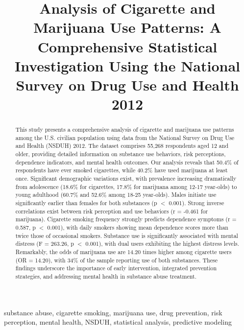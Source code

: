 \documentclass[conference]{IEEEtran}
\begin{document}
\title{Analysis of Cigarette and Marijuana Use Patterns: A Comprehensive Statistical Investigation Using the National Survey on Drug Use and Health 2012}

\author{
}

\maketitle

\begin{abstract}
This study presents a comprehensive analysis of cigarette and marijuana use patterns among the U.S. civilian population using data from the National Survey on Drug Use and Health (NSDUH) 2012. The dataset comprises 55,268 respondents aged 12 and older, providing detailed information on substance use behaviors, risk perceptions, dependence indicators, and mental health outcomes. Our analysis reveals that 50.4\% of respondents have ever smoked cigarettes, while 40.2\% have used marijuana at least once. Significant demographic variations exist, with prevalence increasing dramatically from adolescence (18.6\% for cigarettes, 17.8\% for marijuana among 12-17 year-olds) to young adulthood (60.7\% and 52.6\% among 18-25 year-olds). Males initiate use significantly earlier than females for both substances (p $<$ 0.001). Strong inverse correlations exist between risk perception and use behaviors (r = -0.461 for marijuana). Cigarette smoking frequency strongly predicts dependence symptoms (r = 0.587, p $<$ 0.001), with daily smokers showing mean dependence scores more than twice those of occasional smokers. Substance use is significantly associated with mental distress (F = 263.26, p $<$ 0.001), with dual users exhibiting the highest distress levels. Remarkably, the odds of marijuana use are 14.20 times higher among cigarette users (OR = 14.20), with 34\% of the sample reporting use of both substances. These findings underscore the importance of early intervention, integrated prevention strategies, and addressing mental health in substance abuse treatment.
\end{abstract}

\begin{IEEEkeywords}
substance abuse, cigarette smoking, marijuana use, drug prevention, risk perception, mental health, NSDUH, statistical analysis, predictive modeling
\end{IEEEkeywords}
\end{document}
